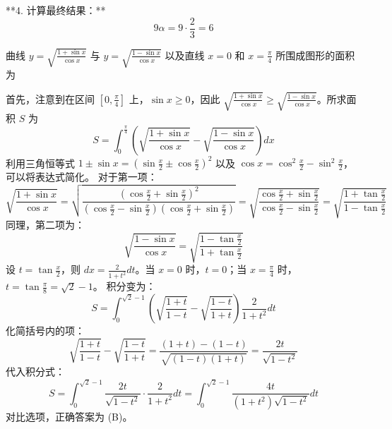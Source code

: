 \begin{questions}
\begin{solution}
**4. 计算最终结果：**
\[
9\alpha = 9 \cdot \frac{2}{3} = 6
\]
\end{solution}

\question
曲线 $y = \sqrt{\frac{1 + \sin x}{\cos x}}$ 与 $y = \sqrt{\frac{1 - \sin x}{\cos x}}$ 以及直线 $x = 0$ 和 $x = \frac{\pi}{4}$ 所围成图形的面积为

\begin{solution}
首先，注意到在区间 $\left[0, \frac{\pi}{4}\right]$ 上，$\sin x \ge 0$，因此 $\sqrt{\frac{1 + \sin x}{\cos x}} \ge \sqrt{\frac{1 - \sin x}{\cos x}}$。所求面积 $S$ 为
\[
S = \int_{0}^{\frac{\pi}{4}} \left( \sqrt{\frac{1 + \sin x}{\cos x}} - \sqrt{\frac{1 - \sin x}{\cos x}} \right) dx
\]
利用三角恒等式 $1 \pm \sin x = \left( \sin \frac{x}{2} \pm \cos \frac{x}{2} \right)^2$ 以及 $\cos x = \cos^2 \frac{x}{2} - \sin^2 \frac{x}{2}$，可以将表达式简化。
对于第一项：
\[
\sqrt{\frac{1 + \sin x}{\cos x}} = \sqrt{\frac{(\cos \frac{x}{2} + \sin \frac{x}{2})^2}{(\cos \frac{x}{2} - \sin \frac{x}{2})(\cos \frac{x}{2} + \sin \frac{x}{2})}} = \sqrt{\frac{\cos \frac{x}{2} + \sin \frac{x}{2}}{\cos \frac{x}{2} - \sin \frac{x}{2}}} = \sqrt{\frac{1 + \tan \frac{x}{2}}{1 - \tan \frac{x}{2}}}
\]
同理，第二项为：
\[
\sqrt{\frac{1 - \sin x}{\cos x}} = \sqrt{\frac{1 - \tan \frac{x}{2}}{1 + \tan \frac{x}{2}}}
\]
设 $t = \tan \frac{x}{2}$，则 $dx = \frac{2}{1 + t^2} dt$。当 $x = 0$ 时，$t = 0$；当 $x = \frac{\pi}{4}$ 时，$t = \tan \frac{\pi}{8} = \sqrt{2} - 1$。
积分变为：
\[
S = \int_{0}^{\sqrt{2}-1} \left( \sqrt{\frac{1 + t}{1 - t}} - \sqrt{\frac{1 - t}{1 + t}} \right) \frac{2}{1 + t^2} dt
\]
化简括号内的项：
\[
\sqrt{\frac{1 + t}{1 - t}} - \sqrt{\frac{1 - t}{1 + t}} = \frac{(1 + t) - (1 - t)}{\sqrt{(1 - t)(1 + t)}} = \frac{2t}{\sqrt{1 - t^2}}
\]
代入积分式：
\[
S = \int_{0}^{\sqrt{2}-1} \frac{2t}{\sqrt{1 - t^2}} \cdot \frac{2}{1 + t^2} dt = \int_{0}^{\sqrt{2}-1} \frac{4t}{(1 + t^2)\sqrt{1 - t^2}} dt
\]
对比选项，正确答案为 (B)。


\end{solution}
\end{questions}
